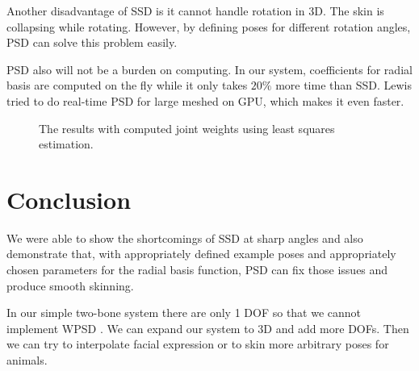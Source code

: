 \documentclass[11pt,twocolumn,letterpaper]{article}
\begin{document}
Another disadvantage of SSD is it cannot handle rotation in 3D. The skin is collapsing while rotating. However, by defining poses for different rotation angles, PSD can solve this problem easily.

PSD also will not be a burden on computing. In our system, coefficients for radial basis are computed on the fly while it only takes $20\%$ more time than SSD. Lewis \cite{rhee2006real} tried to do real-time PSD for large meshed on GPU, which makes it even faster. 

\begin{figure}[t]
\begin{center}
\end{center}
   \caption{The results with computed joint weights using least squares estimation.}
\label{fig:long}
\label{fig:onecol}
\label{com_w}
\end{figure}

\section{Conclusion}

We were able to show the shortcomings of SSD at sharp angles and also demonstrate that, with appropriately defined example poses and appropriately chosen parameters for the radial basis function, PSD can fix those issues and produce smooth skinning.

In our simple two-bone system there are only 1 DOF so that we cannot implement WPSD \cite{kurihara2004modeling}. We can expand our system to 3D and add more DOFs. Then we can try to interpolate facial expression or to skin more arbitrary poses for animals. 
\end{document}
